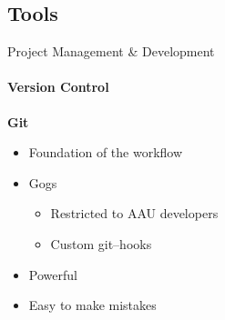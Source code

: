 \subsection{Tools}
\begin{frame}{Project Management \& Development}\framesubtitle{Version Control}
    \textbf{Git}
    \begin{itemize}
        \item Foundation of the workflow
        \item Gogs
        \begin{itemize}
            \item Restricted to AAU developers
            \item Custom git--hooks
        \end{itemize}
        \item Powerful
        \item Easy to make mistakes
    \end{itemize}
\end{frame}

